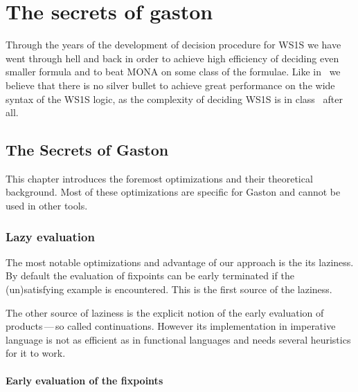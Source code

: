  
\chapter{The secrets of gaston}
\begin{intro}
Through the years of the development of decision procedure for WS1S we 
have went through hell and back in order to achieve high efficiency
of deciding even smaller formula and to beat MONA on some class of the
formulae. Like in~\cite{mona:secrets} we believe that there is no silver
bullet to achieve great performance on the wide syntax of the WS1S logic,
as the complexity of deciding WS1S is in \nonelementary 
class~\cite{ws1s:nonelementary} after all.
\end{intro}

\section{The Secrets of Gaston}

This chapter introduces the foremost optimizations and their theoretical background. Most of these optimizations are specific for
Gaston and cannot be used in other tools. 

  \subsection{Lazy evaluation}
  The most notable optimizations and advantage of our approach is the
  its laziness. By default the evaluation of fixpoints can be early
  terminated if the (un)satisfying example is encountered. This is 
  the first source of the laziness. 
  
  The other source of laziness is the explicit notion of the early
  evaluation of products\,---\,so called continuations. However its
  implementation in imperative language is not as efficient as in
  functional languages and needs several heuristics for it to work.

    \subsubsection{Early evaluation of the fixpoints}      
    
